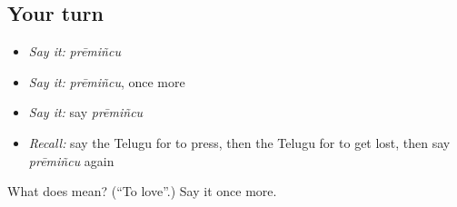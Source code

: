 \subsection*{Your turn}
\begin{itemize}
\raggedright
  \item \emph{Say it:} \emph{prēmiñcu}
  \item \emph{Say it:} \emph{prēmiñcu}, once more
  \item \emph{Say it:} say \emph{prēmiñcu}
  \item \emph{Recall:} say the Telugu for to press, then the Telugu for to get lost, then say \emph{prēmiñcu} again
\end{itemize}

\begin{tcolorbox}[breakable,colback=teal!4,colframe=teal!35!black,title={Before you move on}]
What does  mean? (\textquotedblleft{}To love\textquotedblright{}.) Say it once more.
\end{tcolorbox}
